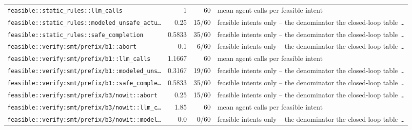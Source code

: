\begin{center}
\begin{longtable}{@{}p{}rrp{}@{}}
\texttt{\scriptsize feasible:\allowbreak :\allowbreak static\_\allowbreak rules:\allowbreak :\allowbreak llm\_\allowbreak calls} & 1 & 60 & mean agent calls per feasible intent \\
\texttt{\scriptsize feasible:\allowbreak :\allowbreak static\_\allowbreak rules:\allowbreak :\allowbreak modeled\_\allowbreak unsafe\_\allowbreak actu…} & 0.25 & 15/60 & feasible intents only -- the denominator the closed-loop table … \\
\texttt{\scriptsize feasible:\allowbreak :\allowbreak static\_\allowbreak rules:\allowbreak :\allowbreak safe\_\allowbreak completion} & 0.5833 & 35/60 & feasible intents only -- the denominator the closed-loop table … \\
\texttt{\scriptsize feasible:\allowbreak :\allowbreak verify:\allowbreak smt/\allowbreak prefix/\allowbreak b1:\allowbreak :\allowbreak abort} & 0.1 & 6/60 & feasible intents only -- the denominator the closed-loop table … \\
\texttt{\scriptsize feasible:\allowbreak :\allowbreak verify:\allowbreak smt/\allowbreak prefix/\allowbreak b1:\allowbreak :\allowbreak llm\_\allowbreak calls} & 1.1667 & 60 & mean agent calls per feasible intent \\
\texttt{\scriptsize feasible:\allowbreak :\allowbreak verify:\allowbreak smt/\allowbreak prefix/\allowbreak b1:\allowbreak :\allowbreak modeled\_\allowbreak uns…} & 0.3167 & 19/60 & feasible intents only -- the denominator the closed-loop table … \\
\texttt{\scriptsize feasible:\allowbreak :\allowbreak verify:\allowbreak smt/\allowbreak prefix/\allowbreak b1:\allowbreak :\allowbreak safe\_\allowbreak comple…} & 0.5833 & 35/60 & feasible intents only -- the denominator the closed-loop table … \\
\texttt{\scriptsize feasible:\allowbreak :\allowbreak verify:\allowbreak smt/\allowbreak prefix/\allowbreak b3/\allowbreak nowit:\allowbreak :\allowbreak abort} & 0.25 & 15/60 & feasible intents only -- the denominator the closed-loop table … \\
\texttt{\scriptsize feasible:\allowbreak :\allowbreak verify:\allowbreak smt/\allowbreak prefix/\allowbreak b3/\allowbreak nowit:\allowbreak :\allowbreak llm\_\allowbreak c…} & 1.85 & 60 & mean agent calls per feasible intent \\
\texttt{\scriptsize feasible:\allowbreak :\allowbreak verify:\allowbreak smt/\allowbreak prefix/\allowbreak b3/\allowbreak nowit:\allowbreak :\allowbreak model…} & 0.0 & 0/60 & feasible intents only -- the denominator the closed-loop table … \\

\end{longtable}
\end{center}
